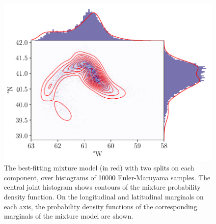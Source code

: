 \begin{figure}
	\centering
	\includegraphics[width=\textwidth]{chp06_applications/figures/gulf_stream/gmm_2split_best}
	\caption{The best-fitting mixture model (in red) with two splits on each component, over histograms of 10000 Euler-Maruyama samples.
		The central joint histogram shows contours of the mixture probability density function.
		On the longitudinal and latitudinal marginals on each axis, the probability density functions of the corresponding marginals of the mixture model are shown.}
	\label{fig:na_2split_best}
\end{figure}

